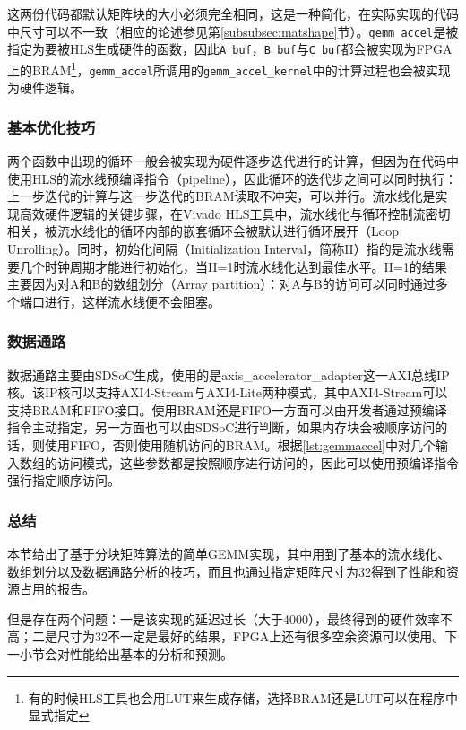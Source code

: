 这两份代码都默认矩阵块的大小必须完全相同，这是一种简化，在实际实现的代码中尺寸可以不一致（相应的论述参见第\ref{subsubsec:matshape}节）。\texttt{gemm\_accel}是被指定为要被HLS生成硬件的函数，因此\texttt{A\_buf}，\texttt{B\_buf}与\texttt{C\_buf}都会被实现为FPGA上的BRAM\footnote{有的时候HLS工具也会用LUT来生成存储，选择BRAM还是LUT可以在程序中显式指定}，\texttt{gemm\_accel}所调用的\texttt{gemm\_accel\_kernel}中的计算过程也会被实现为硬件逻辑。

\subsubsection{基本优化技巧}

两个函数中出现的循环一般会被实现为硬件逐步迭代进行的计算，但因为在代码中使用HLS的流水线预编译指令（pipeline），因此循环的迭代步之间可以同时执行：上一步迭代的计算与这一步迭代的BRAM读取不冲突，可以并行。流水线化是实现高效硬件逻辑的关键步骤，在Vivado HLS工具中，流水线化与循环控制流密切相关，被流水线化的循环内部的嵌套循环会被默认进行循环展开（Loop Unrolling）。同时，初始化间隔（Initialization Interval，简称II）指的是流水线需要几个时钟周期才能进行初始化，当II=1时流水线化达到最佳水平。II=1的结果主要因为对A和B的数组划分（Array partition）：对A与B的访问可以同时通过多个端口进行，这样流水线便不会阻塞。

\subsubsection{数据通路}\label{subsubsec:interface}

数据通路主要由SDSoC生成，使用的是axis\_accelerator\_adapter这一AXI总线IP核\supercite{ug1027}。该IP核可以支持AXI4-Stream与AXI4-Lite两种模式，其中AXI4-Stream可以支持BRAM和FIFO接口。使用BRAM还是FIFO一方面可以由开发者通过预编译指令主动指定，另一方面也可以由SDSoC进行判断，如果内存块会被顺序访问的话，则使用FIFO，否则使用随机访问的BRAM。根据\ref{lst:gemmaccel}中对几个输入数组的访问模式，这些参数都是按照顺序进行访问的，因此可以使用预编译指令强行指定顺序访问。

\subsubsection{总结}
本节给出了基于分块矩阵算法的简单GEMM实现，其中用到了基本的流水线化、数组划分以及数据通路分析的技巧，而且也通过指定矩阵尺寸为32得到了性能和资源占用的报告。

但是存在两个问题：一是该实现的延迟过长（大于4000），最终得到的硬件效率不高；二是尺寸为32不一定是最好的结果，FPGA上还有很多空余资源可以使用。下一小节会对性能给出基本的分析和预测。


